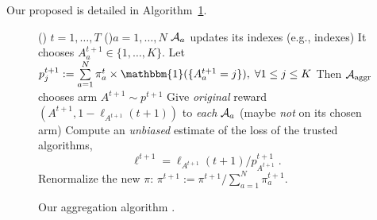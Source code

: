 Our proposed \Aggr{} is detailed in Algorithm~\ref{algo:25:Aggr}.
%
\begin{small}
	\begin{figure}[h!]
		\centering
		\begin{algorithm}[H]
			\For()
            {$t = 1, \dots, T$}{
				\For(){$a = 1, \dots, N$}{
					$\Alg_a$ updates its indexes (e.g., \UCB{} indexes)\;
					It chooses $A^{t+1}_{a} \in \{1, \dots, K\}$.
				}
				Let $p^{t+1}_j := \sum\limits_{a = 1}^{N} \pi^{t}_a \times \mathbbm{1}(\{A^{t+1}_{a} = j\}), \;\forall 1\leq j \leq K$\;
				Then $\mathcal{A}_{\mathrm{aggr}}$ chooses arm $A^{t+1} \sim p^{t+1}$\;
				Give \emph{original} reward $(A^{t+1}, 1 - \ell_{A^{t+1}}(t+1))$ to \emph{each} $\Alg_a$ (maybe \emph{not} on its chosen arm)\;
				Compute an \emph{unbiased} estimate of the loss of the trusted algorithms,$$ \ell^{t+1} = \ell_{A^{t+1}}(t+1) / p^{t+1}_{A^{t+1}}\;. $$
				\For{$a = 1, \dots, N$}{
					\If{$\Alg_a$ was trusted, \ie, $A^{t+1}_{a} = A^{t+1}$}{
						$ \pi^{t+1}_{a} = \exp(\eta_t \ell^{t+1}) \times \pi^{t}_{a} $
						}%
				}
				Renormalize the new $\pi$: $\pi^{t+1} := \pi^{t+1} / \sum_{a=1}^{N} \pi^{t+1}_{a}$.
			}
			\caption{Our aggregation algorithm \Aggr.}
			\label{algo:25:Aggr}
		\end{algorithm}
	\end{figure}
\end{small}


